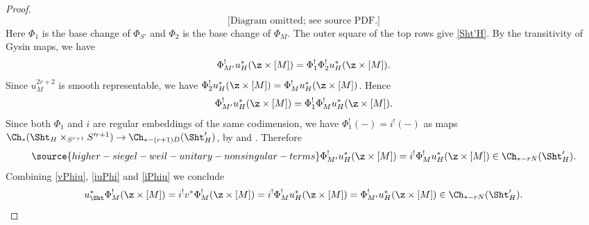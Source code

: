 \begin{proof}
\begin{equation}
\text{[Diagram omitted; see source PDF.]}
\end{equation}
Here $\Phi_{1}$ is the base change of $\Phi_{S'}$ and $\Phi_{2}$ is the base change of $\Phi_{M}$. The outer square of the top rows give \eqref{Sht'H}. By the transitivity of Gysin maps, we have
\begin{equation}
\Phi_{M'}^{!}u_{H}^{*}(\z\times [M])=\Phi^{!}_{1}\Phi^{!}_{2}u_{H}^{*}(\z \times [M]).
\end{equation}
Since $u^{2r+2}_{M}$  is smooth representable, we have $\Phi_{2}^{!}u_{H}^{*}(\z \times [M])=\Phi_{M}^{!}u_{H}^{*}(\z \times [M])$. Hence \begin{equation}
\Phi_{M'}^{!}u_{H}^{*}(\z\times [M])=\Phi^{!}_{1}\Phi_{M}^{!}u_{H}^{*}(\z\times [M]).
\end{equation}
Since both $\Phi_{1}$ and $i$ are regular embeddings of the same codimension, we have $\Phi^{!}_{1}(-)=i^{!}(-)$ as maps $\Ch_{*}(\Sht_{H}\times_{S^{r+1}}S'^{r+1})\to \Ch_{*-(r+1)D}(\Sht'_{H})$, by \cite[Theorem 2.1.12(xi)]{Kr99} and \cite[Theorem 6.2(c)]{Ful98}. Therefore
\begin{equation}\label{iPhiu}
\source{higher-siegel-weil-unitary-nonsingular-terms}
\Phi_{M'}^{!}u_{H}^{*}(\z\times [M])=i^{!}\Phi_{M}^{!}u_{H}^{*}(\z\times [M])\in \Ch_{*-rN}(\Sht'_{H}).
\end{equation}
Combining \eqref{vPhiu}, \eqref{iuPhi} and \eqref{iPhiu} we conclude
\begin{equation}
u_{\Sht}^{*}\Phi_{M}^{!}(\z\times [M])=i^{!}v^{*}\Phi_{M}^{!}(\z\times [M])=i^{!}\Phi_{M}^{!}u_{H}^{*}(\z\times [M])=\Phi_{M'}^{!}u_{H}^{*}(\z\times [M])\in \Ch_{*-rN}(\Sht'_{H}).
\end{equation}
\end{proof}


